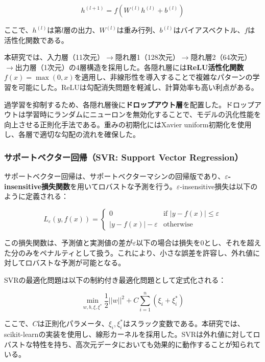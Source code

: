 \documentclass[12pt,a4paper,dvipdfmx]{jsarticle}
\begin{document}
\begin{equation}
h^{(l+1)} = f(W^{(l)}h^{(l)} + b^{(l)})
\end{equation}

ここで、$h^{(l)}$は第$l$層の出力、$W^{(l)}$は重み行列、$b^{(l)}$はバイアスベクトル、$f$は活性化関数である。

本研究では、入力層（11次元）$\rightarrow$隠れ層1（128次元）$\rightarrow$隠れ層2（64次元）$\rightarrow$出力層（1次元）の4層構造を採用した。各隠れ層には\textbf{ReLU活性化関数}$f(x) = \max(0, x)$を適用し、非線形性を導入することで複雑なパターンの学習を可能にした。ReLUは勾配消失問題を軽減し、計算効率も高い利点がある。

過学習を抑制するため、各隠れ層後に\textbf{ドロップアウト層}を配置した。ドロップアウトは学習時にランダムにニューロンを無効化することで、モデルの汎化性能を向上させる正則化手法である。重みの初期化にはXavier uniform初期化を使用し、各層で適切な勾配の流れを確保した。

\subsubsection{サポートベクター回帰（SVR: Support Vector Regression）}

サポートベクター回帰は、サポートベクターマシンの回帰版であり、\textbf{$\varepsilon$-insensitive損失関数}を用いてロバストな予測を行う。$\varepsilon$-insensitive損失は以下のように定義される：

\begin{equation}
L_\varepsilon(y, f(x)) = \begin{cases} 
0 & \text{if } |y - f(x)| \leq \varepsilon \\
|y - f(x)| - \varepsilon & \text{otherwise}
\end{cases}
\end{equation}

この損失関数は、予測値と実測値の差が$\varepsilon$以下の場合は損失を0とし、それを超えた分のみをペナルティとして扱う。これにより、小さな誤差を許容し、外れ値に対してロバストな予測が可能となる。

SVRの最適化問題は以下の制約付き最適化問題として定式化される：

\begin{equation}
\min_{w,b,\xi,\xi^*} \frac{1}{2}||w||^2 + C\sum_{i=1}^n(\xi_i + \xi_i^*)
\end{equation}

ここで、$C$は正則化パラメータ、$\xi_i, \xi_i^*$はスラック変数である。本研究では、scikit-learnの実装を使用し、線形カーネルを採用した。SVRは外れ値に対してロバストな特性を持ち、高次元データにおいても効果的に動作することが知られている。
\end{document}
